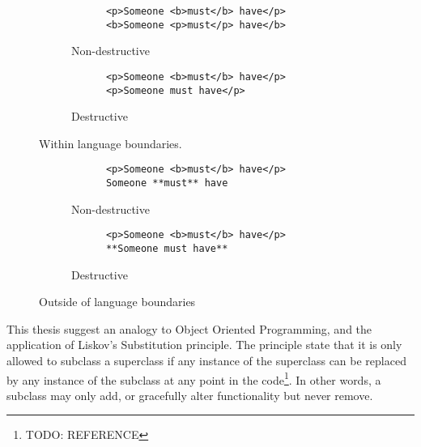 \documentclass{scrreprt}
\begin{document}
\begin{figure}[h]
  \centering
  
  \begin{subfigure}{.5\textwidth}
    \begin{lstlisting}
      <p>Someone <b>must</b> have</p>
      <b>Someone <p>must</p> have</b>
    \end{lstlisting}

    \caption{Non-destructive}

  \end{subfigure}%
  \begin{subfigure}{.5\textwidth}

    \begin{lstlisting}
      <p>Someone <b>must</b> have</p>
      <p>Someone must have</p>
    \end{lstlisting}

    \caption{Destructive}
  \end{subfigure}

  \caption{Within language boundaries.}
\end{figure}


\begin{figure}[h]
  \centering
  
  \begin{subfigure}{.5\textwidth}
    \begin{lstlisting}
      <p>Someone <b>must</b> have</p>
      Someone **must** have
    \end{lstlisting}

    \caption{Non-destructive}

  \end{subfigure}%
  \begin{subfigure}{.5\textwidth}

    \begin{lstlisting}
      <p>Someone <b>must</b> have</p>
      **Someone must have**
    \end{lstlisting}

    \caption{Destructive}
  \end{subfigure}

  \caption{Outside of language boundaries}
\end{figure}


This thesis suggest an analogy to Object Oriented Programming, and the application of Liskov's Substitution principle. The principle state that it is only allowed to subclass a superclass if any instance of the superclass can be replaced by any instance of the subclass at any point in the code\footnote{TODO: REFERENCE}. In other words, a subclass may only add, or gracefully alter functionality but never remove.
\end{document}
